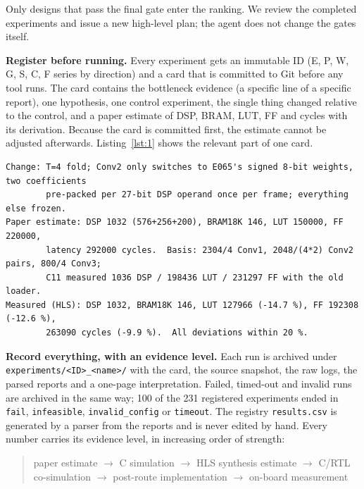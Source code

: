 Only designs that pass the final gate enter the ranking. We review the completed experiments and issue a new high-level plan; the agent does not change the gates itself.

\textbf{Register before running.} Every experiment gets an immutable ID (E, P, W, G, S, C, F series by direction) and a card that is committed to Git before any tool runs. The card contains the bottleneck evidence (a specific line of a specific report), one hypothesis, one control experiment, the single thing changed relative to the control, and a paper estimate of DSP, BRAM, LUT, FF and cycles with its derivation. Because the card is committed first, the estimate cannot be adjusted afterwards. Listing~\ref{lst:1} shows the relevant part of one card.

\begin{lstlisting}[caption={Experiment card C13 (excerpt), planned 2026-10-12T04:58 UTC, control W21.},label={lst:1},language={}]
Change: T=4 fold; Conv2 only switches to E065's signed 8-bit weights, two coefficients
        pre-packed per 27-bit DSP operand once per frame; everything else frozen.
Paper estimate: DSP 1032 (576+256+200), BRAM18K 146, LUT 150000, FF 220000,
        latency 292000 cycles.  Basis: 2304/4 Conv1, 2048/(4*2) Conv2 pairs, 800/4 Conv3;
        C11 measured 1036 DSP / 198436 LUT / 231297 FF with the old loader.
Measured (HLS): DSP 1032, BRAM18K 146, LUT 127966 (-14.7 %), FF 192308 (-12.6 %),
        263090 cycles (-9.9 %).  All deviations within 20 %.
\end{lstlisting}

\textbf{Record everything, with an evidence level.} Each run is archived under \texttt{experiments/\allowbreak{}<ID>\_\allowbreak{}<name>/\allowbreak{}} with the card, the source snapshot, the raw logs, the parsed reports and a one-page interpretation. Failed, timed-out and invalid runs are archived in the same way; 100 of the 231 registered experiments ended in \texttt{fail}, \texttt{infeasible}, \texttt{invalid\_config} or \texttt{timeout}. The registry \texttt{results.csv} is generated by a parser from the reports and is never edited by hand. Every number carries its evidence level, in increasing order of strength:

\begin{quote}
paper estimate $\rightarrow$ C simulation $\rightarrow$ HLS synthesis estimate $\rightarrow$ C/RTL co-simulation $\rightarrow$ post-route implementation $\rightarrow$ on-board measurement
\end{quote}

